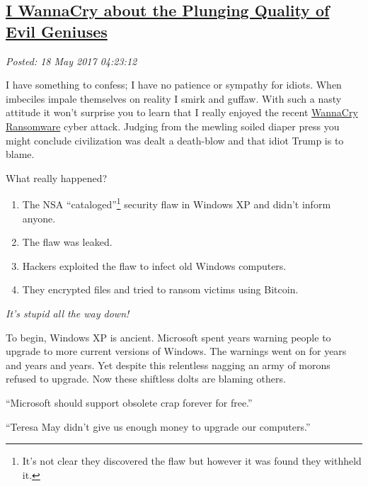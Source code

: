 %

\subsection*{\href{https://analyzethedatanotthedrivel.org/2017/05/17/i-wannacry-about-the-plunging-quality-of-evil-geniuses/}{I WannaCry about the Plunging Quality of Evil Geniuses}}


\noindent\emph{Posted: 18 May 2017 04:23:12}
\vspace{6pt}

I have something to confess; I have no patience or sympathy for idiots.
When imbeciles impale themselves on reality I smirk and guffaw. With
such a nasty attitude it won't surprise you to learn that I really
enjoyed the recent
\href{https://en.wikipedia.org/wiki/WannaCry_ransomware_attack}{WannaCry
Ransomware} cyber attack. Judging from the mewling soiled diaper press
you might conclude civilization was dealt a death-blow and that idiot
Trump is to blame.

What really happened?

\begin{enumerate}
\def\labelenumi{\arabic{enumi}.}
\item
  The NSA ``cataloged''\footnote{It's not clear
  they discovered the flaw but however it was found they withheld it.} %
  security flaw in Windows XP and didn't inform anyone.
\item
  The flaw was leaked.
\item
  Hackers exploited the flaw to infect old Windows computers.
\item
  They encrypted files and tried to ransom victims using Bitcoin.
\end{enumerate}

\emph{It's stupid all the way down!}

To begin, Windows XP is ancient. Microsoft spent years warning people to
upgrade to more current versions of Windows. The warnings went on for
years and years and years. Yet despite this relentless nagging an army
of morons refused to upgrade. Now these shiftless dolts are blaming
others.

``Microsoft should support obsolete crap forever for free.''

``Teresa May didn't give us enough money to upgrade our computers.''

